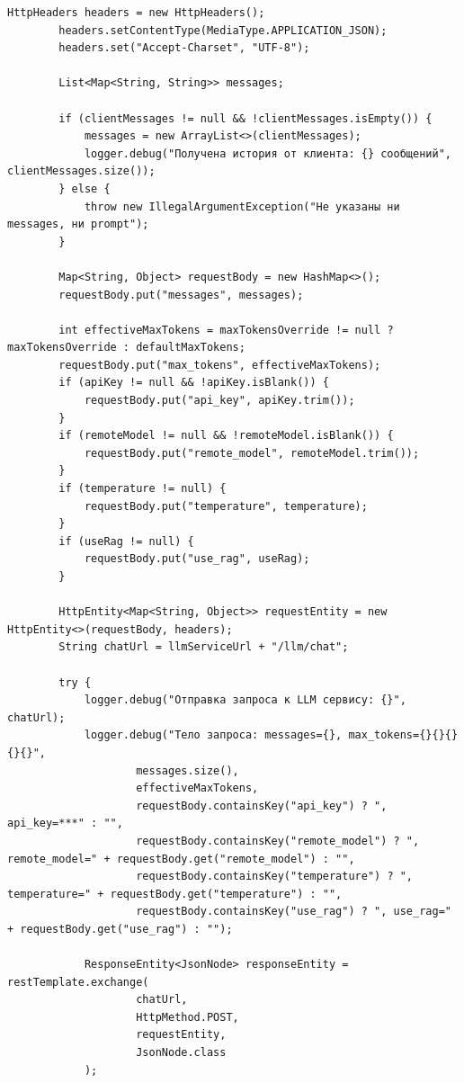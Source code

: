 \begin{lstlisting}[basicstyle=\tiny\ttfamily,breaklines=true]
        HttpHeaders headers = new HttpHeaders();
        headers.setContentType(MediaType.APPLICATION_JSON);
        headers.set("Accept-Charset", "UTF-8");

        List<Map<String, String>> messages;

        if (clientMessages != null && !clientMessages.isEmpty()) {
            messages = new ArrayList<>(clientMessages);
            logger.debug("Получена история от клиента: {} сообщений", clientMessages.size());
        } else {
            throw new IllegalArgumentException("Не указаны ни messages, ни prompt");
        }
        
        Map<String, Object> requestBody = new HashMap<>();
        requestBody.put("messages", messages);

        int effectiveMaxTokens = maxTokensOverride != null ? maxTokensOverride : defaultMaxTokens;
        requestBody.put("max_tokens", effectiveMaxTokens);
        if (apiKey != null && !apiKey.isBlank()) {
            requestBody.put("api_key", apiKey.trim());
        }
        if (remoteModel != null && !remoteModel.isBlank()) {
            requestBody.put("remote_model", remoteModel.trim());
        }
        if (temperature != null) {
            requestBody.put("temperature", temperature);
        }
        if (useRag != null) {
            requestBody.put("use_rag", useRag);
        }

        HttpEntity<Map<String, Object>> requestEntity = new HttpEntity<>(requestBody, headers);
        String chatUrl = llmServiceUrl + "/llm/chat";

        try {
            logger.debug("Отправка запроса к LLM сервису: {}", chatUrl);
            logger.debug("Тело запроса: messages={}, max_tokens={}{}{}{}{}",
                    messages.size(),
                    effectiveMaxTokens,
                    requestBody.containsKey("api_key") ? ", api_key=***" : "",
                    requestBody.containsKey("remote_model") ? ", remote_model=" + requestBody.get("remote_model") : "",
                    requestBody.containsKey("temperature") ? ", temperature=" + requestBody.get("temperature") : "",
                    requestBody.containsKey("use_rag") ? ", use_rag=" + requestBody.get("use_rag") : "");
            
            ResponseEntity<JsonNode> responseEntity = restTemplate.exchange(
                    chatUrl,
                    HttpMethod.POST,
                    requestEntity,
                    JsonNode.class
            );
            

\end{lstlisting}
